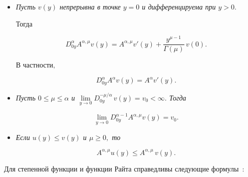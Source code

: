 \begin{itemize}

\item[$1^\circ.$] {\it Пусть $v(y)$ непрерывна в точке $y=0$ и дифференцируема при  $y>0.$ 

Тогда 

$$

D_{0y}^{\alpha} A^{\alpha,  \mu} v(y)=A^{\alpha, \mu} v'(y)+\frac{y^{\mu-1}}{\Gamma(\mu)}\,v(0).

$$

В частности$,$

\begin{equation}\label{IntRight3}

D_{0y}^{\alpha} A^{\alpha} v(y)=A^{\alpha} v'(y).

\end{equation}

 }

 

\item[$2^\circ.$] {\it Пусть $0\leqslant \mu \leqslant \alpha$ и $\lim\limits_{y\to 0}D_{0y}^{-\mu/\alpha}\,v(y)=v_0<\infty.$ Тогда

\begin{equation}\label{IntRight4}

\lim\limits_{y\to 0}D_{0y}^{\alpha-1} A^{\alpha, \mu} v(y)=v_0.

\end{equation}

}



\item[$3^\circ.$] {\it Если $u(y) \leqslant v(y)$ и $\mu \geqslant 0,$ то

\begin{equation}\label{IntRight5}

A^{\alpha,  \mu} u(y) \leqslant A^{\alpha, \mu}\,v(y).

\end{equation}

}



\end{itemize}







Для степенной функции и функции Райта справедливы следующие формулы~\mbox{\cite[c.~74, 84]{Pskhu}}:

